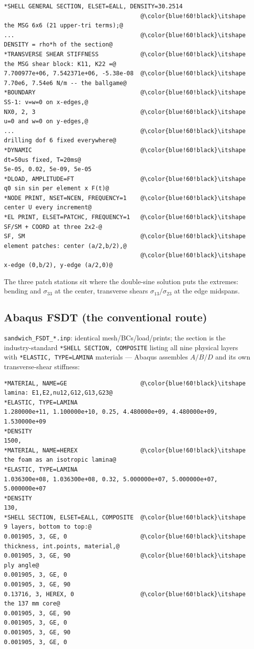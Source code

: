 \documentclass[11pt]{article}
\newcommand{\code}[1]{\texttt{#1}}
\begin{document}
\begin{lstlisting}[style=deck]
*SHELL GENERAL SECTION, ELSET=EALL, DENSITY=30.2514
                                       @\color{blue!60!black}\itshape the MSG 6x6 (21 upper-tri terms);@
...                                    @\color{blue!60!black}\itshape DENSITY = rho*h of the section@
*TRANSVERSE SHEAR STIFFNESS            @\color{blue!60!black}\itshape the MSG shear block: K11, K22 =@
7.700977e+06, 7.542371e+06, -5.38e-08  @\color{blue!60!black}\itshape 7.70e6, 7.54e6 N/m -- the ballgame@
*BOUNDARY                              @\color{blue!60!black}\itshape SS-1: v=w=0 on x-edges,@
NX0, 2, 3                              @\color{blue!60!black}\itshape u=0 and w=0 on y-edges,@
...                                    @\color{blue!60!black}\itshape drilling dof 6 fixed everywhere@
*DYNAMIC                               @\color{blue!60!black}\itshape dt=50us fixed, T=20ms@
5e-05, 0.02, 5e-09, 5e-05
*DLOAD, AMPLITUDE=FT                   @\color{blue!60!black}\itshape q0 sin sin per element x F(t)@
*NODE PRINT, NSET=NCEN, FREQUENCY=1    @\color{blue!60!black}\itshape center U every increment@
*EL PRINT, ELSET=PATCHC, FREQUENCY=1   @\color{blue!60!black}\itshape SF/SM + COORD at three 2x2-@
SF, SM                                 @\color{blue!60!black}\itshape element patches: center (a/2,b/2),@
                                       @\color{blue!60!black}\itshape x-edge (0,b/2), y-edge (a/2,0)@
\end{lstlisting}

The three patch stations sit where the double-sine solution puts the
extremes: bending and $\sigma_{33}$ at the center, transverse shears
$\sigma_{13}/\sigma_{23}$ at the edge midspans.

\subsection{Abaqus FSDT (the conventional route)}
\code{sandwich\_FSDT\_*.inp}: identical mesh/BCs/load/prints; the section
is the industry-standard \code{*SHELL SECTION, COMPOSITE} listing all nine
physical layers with \code{*ELASTIC, TYPE=LAMINA} materials --- Abaqus
assembles $A/B/D$ and its own transverse-shear stiffness:

\begin{lstlisting}[style=deck]
*MATERIAL, NAME=GE                     @\color{blue!60!black}\itshape lamina: E1,E2,nu12,G12,G13,G23@
*ELASTIC, TYPE=LAMINA
1.280000e+11, 1.100000e+10, 0.25, 4.480000e+09, 4.480000e+09, 1.530000e+09
*DENSITY
1500,
*MATERIAL, NAME=HEREX                  @\color{blue!60!black}\itshape the foam as an isotropic lamina@
*ELASTIC, TYPE=LAMINA
1.036300e+08, 1.036300e+08, 0.32, 5.000000e+07, 5.000000e+07, 5.000000e+07
*DENSITY
130,
*SHELL SECTION, ELSET=EALL, COMPOSITE  @\color{blue!60!black}\itshape 9 layers, bottom to top:@
0.001905, 3, GE, 0                     @\color{blue!60!black}\itshape thickness, int.points, material,@
0.001905, 3, GE, 90                    @\color{blue!60!black}\itshape ply angle@
0.001905, 3, GE, 0
0.001905, 3, GE, 90
0.13716, 3, HEREX, 0                   @\color{blue!60!black}\itshape the 137 mm core@
0.001905, 3, GE, 90
0.001905, 3, GE, 0
0.001905, 3, GE, 90
0.001905, 3, GE, 0
\end{lstlisting}
\end{document}
